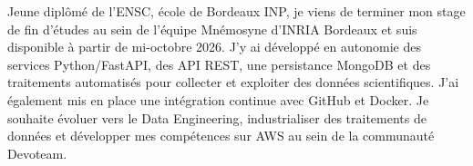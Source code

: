 
\begin{cvparagraph}
Jeune diplômé de l’ENSC, école de Bordeaux INP, je viens de terminer mon stage de fin d’études au sein de l’équipe Mnémosyne d’INRIA Bordeaux et suis disponible à partir de mi-octobre 2026. J’y ai développé en autonomie des services Python/FastAPI, des API REST, une persistance MongoDB et des traitements automatisés pour collecter et exploiter des données scientifiques. J’ai également mis en place une intégration continue avec GitHub et Docker. Je souhaite évoluer vers le Data Engineering, industrialiser des traitements de données et développer mes compétences sur AWS au sein de la communauté Devoteam.
\end{cvparagraph}
